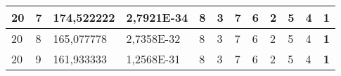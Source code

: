 \documentclass[conference]{IEEEtran}
\begin{document}
\begin{table*}[]
\begin{tabular}{|llll|llllllll|}
\multicolumn{1}{|l|}{20}                                                    & \multicolumn{1}{l|}{7}                                                        & \multicolumn{1}{l|}{174,522222}                                                   & 2,7921E-34                     & \multicolumn{1}{l|}{8}                                                  & \multicolumn{1}{l|}{3}                                                  & \multicolumn{1}{l|}{7}                                                  & \multicolumn{1}{l|}{6}                                                  & \multicolumn{1}{l|}{2}                                                  & \multicolumn{1}{l|}{5}                                                  & \multicolumn{1}{l|}{4}                                                  & \textbf{1}                 \\ \hline
\multicolumn{1}{|l|}{20}                                                    & \multicolumn{1}{l|}{8}                                                        & \multicolumn{1}{l|}{165,077778}                                                   & 2,7358E-32                     & \multicolumn{1}{l|}{8}                                                  & \multicolumn{1}{l|}{3}                                                  & \multicolumn{1}{l|}{7}                                                  & \multicolumn{1}{l|}{6}                                                  & \multicolumn{1}{l|}{2}                                                  & \multicolumn{1}{l|}{5}                                                  & \multicolumn{1}{l|}{4}                                                  & \textbf{1}                 \\ \hline
\multicolumn{1}{|l|}{20}                                                    & \multicolumn{1}{l|}{9}                                                        & \multicolumn{1}{l|}{161,933333}                                                   & 1,2568E-31                     & \multicolumn{1}{l|}{8}                                                  & \multicolumn{1}{l|}{3}                                                  & \multicolumn{1}{l|}{7}                                                  & \multicolumn{1}{l|}{6}                                                  & \multicolumn{1}{l|}{2}                                                  & \multicolumn{1}{l|}{5}                                                  & \multicolumn{1}{l|}{4}                                                  & \textbf{1}                 \\ \hline
\end{tabular}
\label{tab:tabla1.2}
\end{table*}
\end{document}
